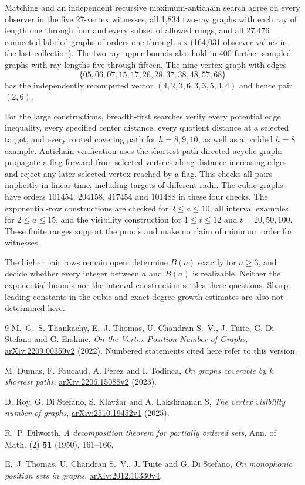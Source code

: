 \documentclass[11pt]{article}
\theoremstyle{remark}\newtheorem{remark}[theorem]{Remark}
\begin{document}
Matching and an independent recursive maximum-antichain search agree on
every observer in the five 27-vertex witnesses, all 1,834 two-ray graphs with
each ray of length one through four and every subset of allowed rungs, and
all 27,476 connected labeled graphs of orders one through six (164,031
observer values in the last collection). The two-ray upper bounds also hold
in 400 further sampled graphs with ray lengths five through fifteen.
The nine-vertex graph with edges
\[
 \{05,06,07,15,17,26,28,37,38,48,57,68\}
\]
has the independently recomputed vector
$(4,2,3,6,3,3,5,4,4)$ and hence pair $(2,6)$.

For the large constructions, breadth-first searches verify every potential
edge inequality, every specified center distance, every quotient distance
at a selected target, and every rooted covering path for $h=8,9,10$, as well
as a padded $h=8$ example. Antichain verification uses the shortest-path
directed acyclic graph: propagate a flag forward from selected vertices
along distance-increasing edges and reject any later selected vertex reached
by a flag. This checks all pairs implicitly in linear time, including targets
of different radii. The cubic graphs have orders $101454$, $204158$, $417454$
and $101488$ in these four checks. The exponential-row constructions are
checked for $2\le a\le10$, all interval examples for $2\le a\le15$, and the
visibility construction for $1\le t\le12$ and $t=20,50,100$. These finite
ranges support the proofs and make no claim of minimum order for witnesses.

The higher pair rows remain open: determine $B(a)$ exactly for $a\ge3$,
and decide whether every integer between $a$ and $B(a)$ is realizable.
Neither the exponential bounds nor the interval construction settles these
questions. Sharp leading constants in the cubic and exact-degree growth
estimates are also not determined here.

\begin{thebibliography}{9}
M.~G.~S. Thankachy, E.~J. Thomas, U. Chandran S.~V., J. Tuite,
G. Di Stefano and G. Erskine,
\emph{On the Vertex Position Number of Graphs},
\href{https://arxiv.org/abs/2209.00359v2}{arXiv:2209.00359v2} (2022).
Numbered statements cited here refer to this version.

M. Dumas, F. Foucaud, A. Perez and I. Todinca,
\emph{On graphs coverable by $k$ shortest paths},
\href{https://arxiv.org/abs/2206.15088v2}{arXiv:2206.15088v2} (2023).

D. Roy, G. Di Stefano, S. Klav\v{z}ar and A. Lakshmanan S,
\emph{The vertex visibility number of graphs},
\href{https://arxiv.org/abs/2510.19452v1}{arXiv:2510.19452v1} (2025).

R.~P. Dilworth, \emph{A decomposition theorem for partially ordered sets},
Ann. of Math. (2) \textbf{51} (1950), 161--166.

E.~J. Thomas, U. Chandran S.~V., J. Tuite and G. Di Stefano,
\emph{On monophonic position sets in graphs},
\href{https://arxiv.org/abs/2012.10330v4}{arXiv:2012.10330v4}.
\end{thebibliography}
\end{document}
